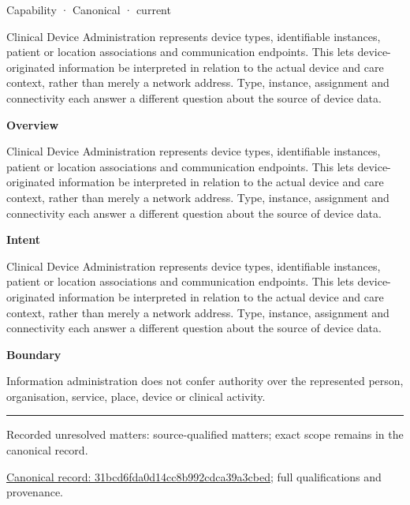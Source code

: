 \label{element:31bcd6fda0d14cc8b992cdca39a3cbed}
{\small Capability · Canonical · current}\par

Clinical Device Administration represents device types, identifiable instances, patient or location associations and communication endpoints. This lets device-originated information be interpreted in relation to the actual device and care context, rather than merely a network address. Type, instance, assignment and connectivity each answer a different question about the source of device data.



\textbf{Overview}



Clinical Device Administration represents device types, identifiable instances, patient or location associations and communication endpoints. This lets device-originated information be interpreted in relation to the actual device and care context, rather than merely a network address. Type, instance, assignment and connectivity each answer a different question about the source of device data.



\textbf{Intent}



Clinical Device Administration represents device types, identifiable instances, patient or location associations and communication endpoints. This lets device-originated information be interpreted in relation to the actual device and care context, rather than merely a network address. Type, instance, assignment and connectivity each answer a different question about the source of device data.



\textbf{Boundary}



Information administration does not confer authority over the represented person, organisation, service, place, device or clinical activity.



\medskip\hrule\medskip

{\small Recorded unresolved matters: source-qualified matters; exact scope remains in the canonical record.}\par
{\footnotesize \href{../../../../continuum/strategy/capability/31bcd6fda0d14cc8b992cdca39a3cbed.md}{Canonical record: 31bcd6fda0d14cc8b992cdca39a3cbed}; full qualifications and provenance.}\par
